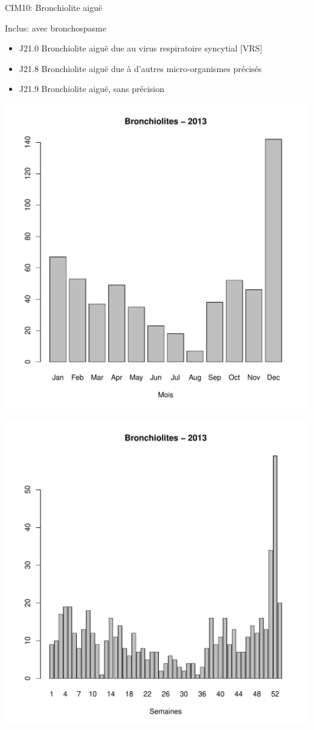 \documentclass[12pt,english,french,twoside]{book}\usepackage[]{graphicx}\usepackage[]{color}
\makeatletter
\def\maxwidth{ %
  \ifdim\Gin@nat@width>\linewidth
    \linewidth
  \else
    \Gin@nat@width
  \fi
}
\newenvironment{knitrout}{}{} %
\makeatother
\begin{document}
CIM10: Bronchiolite aiguë

Inclus:
    avec bronchospasme
\begin{itemize}
  \item J21.0 Bronchiolite aiguë due au virus respiratoire syncytial [VRS]
  \item J21.8 Bronchiolite aiguë due à d'autres micro-organismes précisés
  \item J21.9 Bronchiolite aiguë, sans précision
\end{itemize}

\begin{knitrout}
\color{fgcolor}
\includegraphics[width=\maxwidth]{figure/bron-1} 

\includegraphics[width=\maxwidth]{figure/bron-2} 

\end{knitrout}
\end{document}
